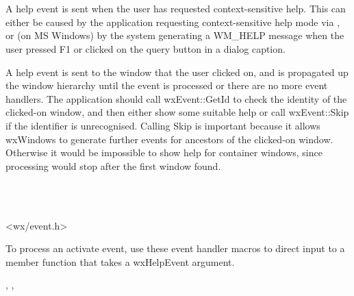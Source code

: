 \section{}\label{wxhelpevent}

A help event is sent when the user has requested context-sensitive help.
This can either be caused by the application requesting
context-sensitive help mode via , or
(on MS Windows) by the system generating a WM\_HELP message when the user pressed F1 or clicked
on the query button in a dialog caption.

A help event is sent to the window that the user clicked on, and is propagated up the
window hierarchy until the event is processed or there are no more event handlers.
The application should call wxEvent::GetId to check the identity of the clicked-on window,
and then either show some suitable help or call wxEvent::Skip if the identifier is unrecognised.
Calling Skip is important because it allows wxWindows to generate further events for ancestors
of the clicked-on window. Otherwise it would be impossible to show help for container windows,
since processing would stop after the first window found.


\\
\\


<wx/event.h>


To process an activate event, use these event handler macros to direct input to a member
function that takes a wxHelpEvent argument.

\twocolwidtha{7cm}
\begin{twocollist}\itemsep=0pt
\end{twocollist}%


,\rtfsp
{},\rtfsp
{}


